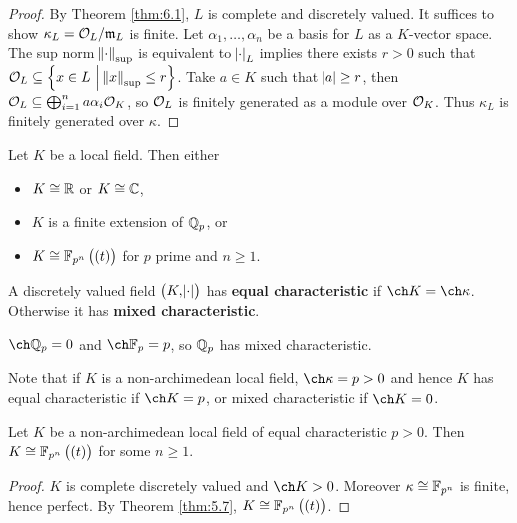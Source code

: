 \begin{proof}
By Theorem \ref{thm:6.1}, $ L $ is complete and discretely valued. It suffices to show $ \kappa_L = \mathcal{O}_L / \mathfrak{m}_L $ is finite. Let $ \alpha_1, \dots, \alpha_n $ be a basis for $ L $ as a $ K $-vector space. The sup norm $ \norm{\cdot}_{\sup} $ is equivalent to $ \abs{\cdot}_L $ implies there exists $ r > 0 $ such that $ \OOO_L \subseteq \cbr{x \in L \st \norm{x}_{\sup} \le r} $. Take $ a \in K $ such that $ \abs{a} \ge r $, then $ \mathcal{O}_L \subseteq \bigoplus_{i = 1}^n a\alpha_i\mathcal{O}_K $, so $ \mathcal{O}_L $ is finitely generated as a module over $ \mathcal{O}_K $. Thus $ \kappa_L $ is finitely generated over $ \kappa $.
\end{proof}

\begin{theorem}
\label{thm:8.2}
Let $ K $ be a local field. Then either
\begin{itemize}
\item $ K \cong \mathbb{R} $ or $ K \cong \mathbb{C} $,
\item $ K $ is a finite extension of $ \mathbb{Q}_p $, or
\item $ K \cong \FF_{p^n}\br{\br{t}} $ for $ p $ prime and $ n \ge 1 $.
\end{itemize}
\end{theorem}

\begin{definition}
A discretely valued field $ \br{K, \abs{\cdot}} $ has \textbf{equal characteristic} if $ \ch K = \ch \kappa $. Otherwise it has \textbf{mixed characteristic}.
\end{definition}

\begin{example*}
$ \ch \QQ_p = 0 $ and $ \ch \FF_p = p $, so $ \mathbb{Q}_p $ has mixed characteristic.
\end{example*}

Note that if $ K $ is a non-archimedean local field, $ \ch \kappa = p > 0 $ and hence $ K $ has equal characteristic if $ \ch K = p $, or mixed characteristic if $ \ch K = 0 $.

\begin{theorem}
\label{thm:8.4}
Let $ K $ be a non-archimedean local field of equal characteristic $ p > 0 $. Then $ K \cong \FF_{p^n}\br{\br{t}} $ for some $ n \ge 1 $.
\end{theorem}

\begin{proof}
$ K $ is complete discretely valued and $ \ch K > 0 $. Moreover $ \kappa \cong \mathbb{F}_{p^n} $ is finite, hence perfect. By Theorem \ref{thm:5.7}, $ K \cong \FF_{p^n}\br{\br{t}} $.
\end{proof}

